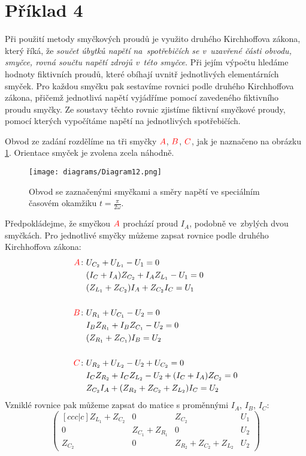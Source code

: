 \section{Příklad 4}

Při použití metody smyčkových proudů je využito druhého Kirchhoffova zákona, který říká, že \textit{součet úbytků napětí na~spotřebičích se v~uzavřené části obvodu, smyčce, rovná součtu napětí zdrojů v~této smyčce}. Při jejím výpočtu hledáme hodnoty fiktivních proudů, které obíhají uvnitř jednotlivých elementárních smyček. Pro každou smyčku pak sestavíme rovnici podle druhého Kirchhoffova zákona, přičemž jednotlivá napětí vyjádříme pomocí zavedeného fiktivního proudu smyčky. Ze soustavy těchto rovnic zjistíme fiktivní smyčkové proudy, pomocí kterých vypočítáme napětí na jednotlivých spotřebičích.

Obvod ze zadání rozdělíme na tři smyčky $\color{red}A$, $\color{red}B$, $\color{red}C$, jak je naznačeno na obrázku \ref{fig:circ-4-1}. Orientace smyček je zvolena zcela náhodně.
\begin{figure}[ht]
    \centering
    \texttt{[image: diagrams/Diagram12.png]}
    \caption{Obvod se zaznačenými smyčkami a směry napětí ve speciálním časovém okamžiku $t = \frac{\pi}{2\omega}$.}
    \label{fig:circ-4-1}
\end{figure}
Předpokládejme, že smyčkou $\color{red}A$ prochází proud $I_A$, podobně ve~zbylých dvou smyčkách. Pro jednotlivé smyčky můžeme zapsat rovnice podle druhého Kirchhoffova zákona:
\begin{align*}
    \textcolor{red}{A}\!:\  & U_{C_2} + U_{L_1} - U_1 = 0 \\
    & (I_C + I_A) Z_{C_2} + I_A Z_{L_1} - U_1 = 0 \\
    & (Z_{L_1}+Z_{C_2}) I_A + Z_{C_2} I_C = U_1 \\
    \\
    \textcolor{red}{B}\!:\  & U_{R_1} + U_{C_1} - U_2 = 0 \\
    & I_B Z_{R_1} + I_B Z_{C_1} - U_2 = 0 \\
    & (Z_{R_1} + Z_{C_1}) I_B = U_2 \\
    \\
    \textcolor{red}{C}\!:\  & U_{R_2} + U_{L_2} - U_2 + U_{C_2} = 0 \\
    & I_C Z_{R_2} + I_C Z_{L_2} - U_2 + (I_C + I_A) Z_{C_2} = 0 \\
    & Z_{C_2} I_A + (Z_{R_2} + Z_{C_2} + Z_{L_2}) I_C = U_2 
\end{align*}
Vzniklé rovnice pak můžeme zapsat do matice s proměnnými $I_A$, $I_B$, $I_C$:
\[
\begin{pmatrix}[ccc|c]
    Z_{L_1} + Z_{C_2} &                 0 & Z_{C_2}                     & U_1 \\
    0                 & Z_{C_1} + Z_{R_1} &                           0 & U_2 \\
    Z_{C_2}           &                 0 & Z_{R_2} + Z_{C_2} + Z_{L_2} & U_2
\end{pmatrix}
\]

